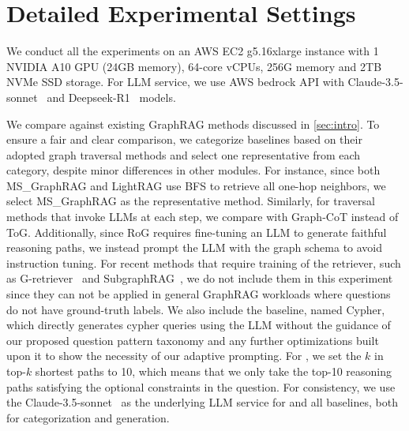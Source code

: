 \section{Detailed Experimental Settings}\label{sec:exp_settings_appendix}

 We conduct all the experiments on an AWS EC2 g5.16xlarge instance with 1 NVIDIA A10 GPU (24GB memory), 64-core vCPUs, 256G memory and 2TB NVMe SSD storage. For LLM service, we use AWS bedrock API with Claude-3.5-sonnet~\cite{claude} and Deepseek-R1~\cite{deepseekr1} models.

 We compare \name{} against existing GraphRAG methods discussed in \autoref{sec:intro}. To ensure a fair and clear comparison, we categorize baselines based on their adopted graph traversal methods and select one representative from each category, despite minor differences in other modules. For instance, since both MS\_GraphRAG and LightRAG use BFS to retrieve all one-hop neighbors, we select MS\_GraphRAG as the representative method. Similarly, for traversal methods that invoke LLMs at each step, we compare with Graph-CoT instead of ToG. Additionally, since RoG requires fine-tuning an LLM to generate faithful reasoning paths, we instead prompt the LLM with the graph schema to avoid instruction tuning. For recent methods that require training of the retriever, such as G-retriever~\cite{gretriever} and SubgraphRAG~\cite{gnnrag}, we do not include them in this experiment since they can not be applied in general GraphRAG workloads where questions do not have ground-truth labels. We also include the baseline, named Cypher, which directly generates cypher queries using the LLM without the guidance of our proposed question pattern taxonomy and any further optimizations built upon it to show the necessity of our adaptive prompting. For \name{}, we set the $k$ in top-$k$ shortest paths to 10, which means that we only take the top-10 reasoning paths satisfying the optional constraints in the question. For consistency, we use the Claude-3.5-sonnet~\cite{claude} as the underlying LLM service for \name{} and all baselines, both for categorization and generation.

